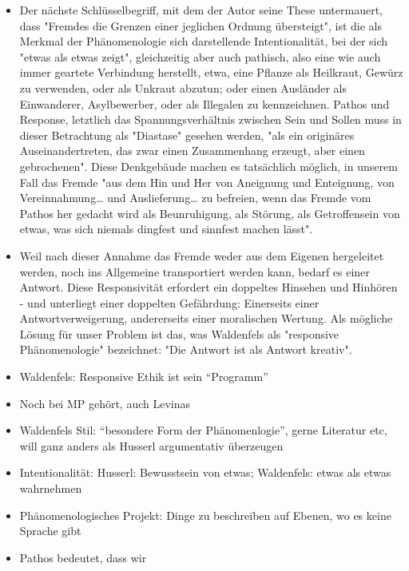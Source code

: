 \documentclass[emulatestandardclasses]{scrartcl}
\begin{document}
\begin{itemize}
  \item Der nächste Schlüsselbegriff, mit dem der Autor seine These untermauert, dass "Fremdes die Grenzen einer jeglichen Ordnung übersteigt", ist die als Merkmal der Phänomenologie sich darstellende Intentionalität, bei der sich "etwas als etwas zeigt", gleichzeitig aber auch pathisch, also eine wie auch immer geartete Verbindung herstellt, etwa, eine Pflanze als Heilkraut, Gewürz zu verwenden, oder als Unkraut abzutun; oder einen Ausländer als Einwanderer, Asylbewerber, oder als Illegalen zu kennzeichnen. Pathos und Response, letztlich das Spannungsverhältnis zwischen Sein und Sollen muss in dieser Betrachtung als "Diastase" gesehen werden, "als ein originäres Auseinandertreten, das zwar einen Zusammenhang erzeugt, aber einen gebrochenen". Diese Denkgebäude machen es tatsächlich möglich, in unserem Fall das Fremde "aus dem Hin und Her von Aneignung und Enteignung, von Vereinnahmung… und Auslieferung… zu befreien, wenn das Fremde vom Pathos her gedacht wird als Beunruhigung, als Störung, als Getroffensein von etwas, was sich niemals dingfest und sinnfest machen lässt".
  \item Weil nach dieser Annahme das Fremde weder aus dem Eigenen hergeleitet werden, noch ins Allgemeine transportiert werden kann, bedarf es einer Antwort. Diese Responsivität erfordert ein doppeltes Hinsehen und Hinhören - und unterliegt einer doppelten Gefährdung: Einerseits einer Antwortverweigerung, andererseits einer moralischen Wertung. Als mögliche Lösung für unser Problem ist das, was Waldenfels als "responsive Phänomenologie" bezeichnet: "Die Antwort ist als Antwort kreativ".
\end{itemize}


\begin{itemize}
  \item Waldenfels: Responsive Ethik ist sein "`Programm"'
  \item Noch bei MP gehört, auch Levinas
  \item Waldenfels Stil: "`besondere Form der Phänomenlogie"', gerne Literatur etc, will ganz anders als Husserl argumentativ überzeugen
  \item Intentionalität: Husserl: Bewusstsein von etwas; Waldenfels: etwas als etwas wahrnehmen
  \item Phänomenologisches Projekt: Dinge zu beschreiben auf Ebenen, wo es keine Sprache gibt
  \item Pathos bedeutet, dass wir 
\end{itemize}
\end{document}
